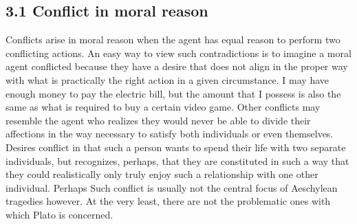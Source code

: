 \documentclass[phdthesis,12pt,final]{wuthesis}
\theoremstyle{definition}
\theoremstyle{definition}
\theoremstyle{definition}
\theoremstyle{definition}
\theoremstyle{remark}
\begin{document}
\subsection*{3.1 Conflict in moral reason}\label{conflict-in-moral-reason}

Conflicts arise in moral reason when the agent has equal reason to perform two conflicting actions. An easy way to view such contradictions is to imagine a moral agent conflicted because they have a desire that does not align in the proper way with what is practically the right action in a given circumstance. I may have enough money to pay the electric bill, but the amount that I possess is also the same as what is required to buy a certain video game. Other conflicts may resemble the agent who realizes they would never be able to divide their affections in the way necessary to satisfy both individuals or even themselves. Desires conflict in that such a person wants to spend their life with two separate individuals, but recognizes, perhaps, that they are constituted in such a way that they could realistically only truly enjoy such a relationship with one other individual. Perhaps Such conflict is usually not the central focus of Aeschylean tragedies however. At the very least, there are not the problematic ones with which Plato is concerned.
\end{document}
